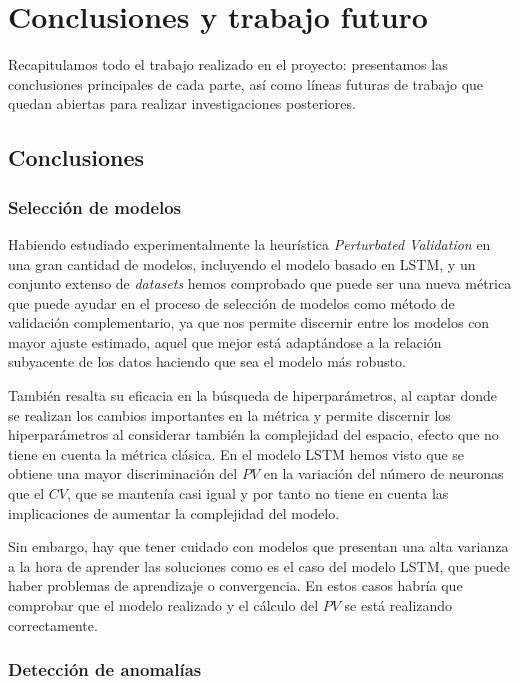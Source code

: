 
\chapter{Conclusiones y trabajo futuro}\label{ch:conclusiones-trabajo}

Recapitulamos todo el trabajo realizado en el proyecto: presentamos las conclusiones principales de cada parte, así como líneas futuras de trabajo que quedan abiertas para realizar investigaciones posteriores.

\section{Conclusiones}

\subsection{Selección de modelos}

Habiendo estudiado experimentalmente la heurística \emph{Perturbated Validation} en una gran cantidad de modelos, incluyendo el modelo basado en LSTM, y un conjunto extenso de \emph{datasets} hemos comprobado que puede ser una nueva métrica que puede ayudar en el proceso de selección de modelos como método de validación complementario, ya que nos permite discernir entre los modelos con mayor ajuste estimado, aquel que mejor está adaptándose a la relación subyacente de los datos haciendo que sea el modelo más robusto.

También resalta su eficacia en la búsqueda de hiperparámetros, al captar donde se realizan los cambios importantes en la métrica y permite discernir los hiperparámetros al considerar también la complejidad del espacio, efecto que no tiene en cuenta la métrica clásica. En el modelo LSTM hemos visto que se obtiene una mayor discriminación del $PV$ en la variación del número de neuronas que el $CV$, que se mantenía casi igual y por tanto no tiene en cuenta las implicaciones de aumentar la complejidad del modelo.

Sin embargo, hay que tener cuidado con modelos que presentan una alta varianza a la hora de aprender las soluciones como es el caso del modelo LSTM, que puede haber problemas de aprendizaje o convergencia. En estos casos habría que comprobar que el modelo realizado y el cálculo del $PV$ se está realizando correctamente.

\subsection{Detección de anomalías}

